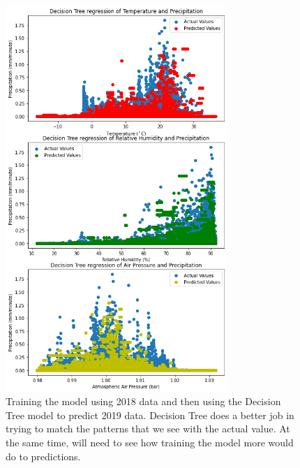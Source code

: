 \documentclass[11pt]{report}
\begin{document}
\begin{figure}[t]
	\centering
	\includegraphics[width=0.75\textwidth]{Figures/ML_DT_reg.png}
	\caption[ML Decision Tree regression run] {\label{ML_DT} Training
          the model using 2018 data and then using the Decision Tree model
          to predict 2019 data. Decision Tree does a better job in trying to
          match the patterns that we see with the actual value. At the same
          time, will need to see how training the model more would do to
          predictions.  }
\end{figure}
\end{document}
